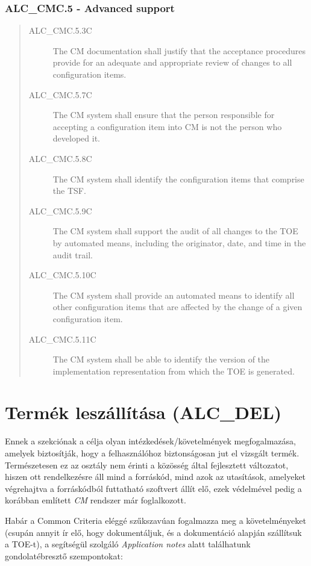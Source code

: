 \subsubsection{ALC\_CMC.5 - Advanced support}
\begin{quote}
    \begin{description}
        \item[ALC\_CMC.5.3C]{The CM documentation shall justify that the acceptance procedures
            provide for an adequate and appropriate review of changes to all configuration items.}
        \item[ALC\_CMC.5.7C]{The CM system shall ensure that the person responsible for accepting a
            configuration item into CM is not the person who developed it.}
        \item[ALC\_CMC.5.8C]{The CM system shall identify the configuration items that comprise the
            TSF.}
        \item[ALC\_CMC.5.9C]{The CM system shall support the audit of all changes to the TOE by
            automated means, including the originator, date, and time in the audit trail.}
        \item[ALC\_CMC.5.10C]{The CM system shall provide an automated means to identify all other
            configuration items that are affected by the change of a given configuration item.}
        \item[ALC\_CMC.5.11C]{The CM system shall be able to identify the version of the
            implementation representation from which the TOE is generated.}
    \end{description}
\end{quote}


\pagebreak[2]
\section{Termék leszállítása (ALC\_DEL)}

Ennek a szekciónak a célja olyan intézkedések/követelmények megfogalmazása, amelyek biztosítják,
hogy a felhasználóhoz biztonságosan jut el vizsgált termék. Természetesen ez az osztály nem érinti a
közösség által fejlesztett változatot, hiszen ott rendelkezésre áll mind a forráskód, mind azok az
utasítások, amelyeket végrehajtva a forráskódból futtatható szoftvert állít elő, ezek védelmével
pedig a korábban említett \emph{CM} rendszer már foglalkozott.

Habár a Common Criteria eléggé szűkszavúan fogalmazza meg a követelményeket (csupán annyit ír elő,
hogy dokumentáljuk, és a dokumentáció alapján szállítsuk a TOE-t), a segítségül szolgáló
\emph{Application notes} alatt találhatunk gondolatébresztő szempontokat:

